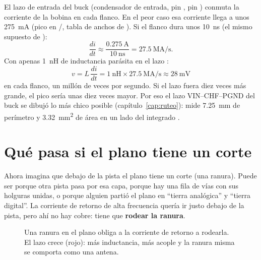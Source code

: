 \begin{calculo}
El lazo de entrada del buck (condensador de entrada, pin , pin ) conmuta la corriente de la bobina
en cada flanco. En el peor caso esa corriente llega a unos \SI{275}{\milli\ampere} \medido{} (pico en
/, tabla de anchos de ). Si el flanco dura unos \SI{10}{\nano\second}
\estimado{} (el mismo supuesto de ):
\[
\frac{di}{dt} \approx \frac{\SI{0.275}{\ampere}}{\SI{10}{\nano\second}} = \SI{27.5}{\mega\ampere\per\second}.
\]
Con apenas \SI{1}{\nano\henry} de inductancia parásita en el lazo \estimado{}:
\[
v = L\,\frac{di}{dt} = \SI{1}{\nano\henry}\times\SI{27.5}{\mega\ampere\per\second} \approx \SI{28}{\milli\volt}
\]
en cada flanco, un millón de veces por segundo. Si el lazo fuera diez veces más grande, el pico sería unas diez veces
mayor. Por eso el lazo VIN--CHF--PGND del buck se dibujó lo más chico posible (capítulo~\ref{cap:ruteo}): mide
\SI{7.25}{\milli\meter} de perímetro y \SI{3.32}{\milli\meter\squared} de área en un lado del integrado
\medido{}.
\end{calculo}

\section{Qué pasa si el plano tiene un corte}\label{sec:c08-ranura}

Ahora imagina que debajo de la pista el plano tiene un corte (una ranura). Puede ser porque otra pista pasa por esa
capa, porque hay una fila de vías con sus holguras unidas, o porque alguien partió el plano en ``tierra analógica'' y
``tierra digital''. La corriente de retorno de alta frecuencia quería ir justo debajo de la pista, pero ahí no hay
cobre: tiene que \textbf{rodear la ranura}.

\begin{figure}[htbp]
\centering
{}
\caption{Una ranura en el plano obliga a la corriente de retorno a rodearla. El lazo crece (rojo): más inductancia,
más acople y la ranura misma se comporta como una antena.}
\label{fig:c08-ranura}
\end{figure}

